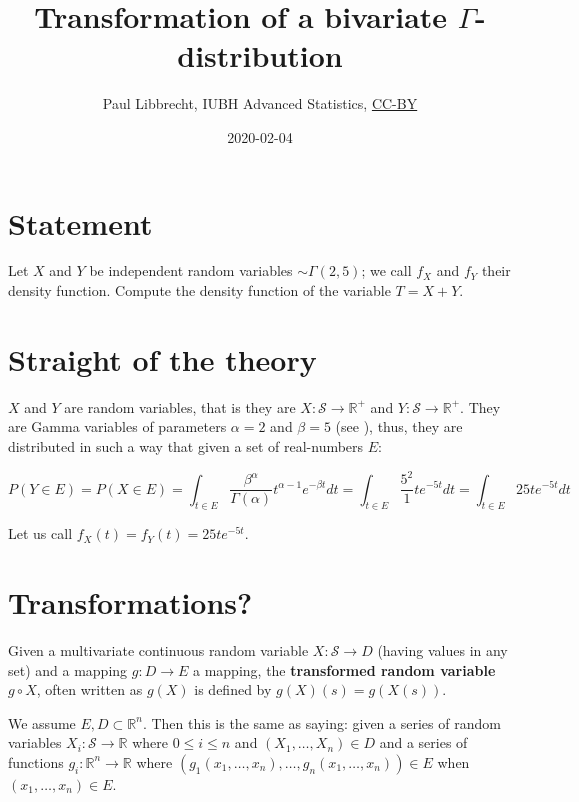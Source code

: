 \documentclass{article}
\newcommand\R{{\mathbb R} }
\renewcommand\S{{\mathcal S}}
\newcommand\goesto{{\longrightarrow}}
\begin{document}
\title{Transformation of a bivariate $\Gamma$-distribution}
\date{2020-02-04}

\author{Paul Libbrecht, IUBH Advanced Statistics, \href{https://creativecommons.org/licenses/by/4.0/}{CC-BY}}
\maketitle




\section{Statement}

Let $X$ and $Y$ be independent random variables $\sim\Gamma(2,5)$; we call $f_X$ and $f_Y$ their density function.
Compute the density function of the variable $T=X+Y$.

\section{Straight of the theory}

$X$ and $Y$ are random variables, that is they are $X:\S \longrightarrow \R^+$ and $Y:{\S }\longrightarrow \R^+$.
They are Gamma variables of parameters $\alpha=2$ and $\beta=5$ (see \cite{Wikipedia-Gamma}), thus, they are distributed in such a way that given a set of real-numbers $E$:

$$P(Y\in E) = P(X\in E) 
  = \int_{t\in E} \frac{\beta^\alpha}{\Gamma({\alpha})}t^{\alpha-1}e^{-\beta t}dt 
  = \int_{t\in E} \frac{5^2}{1} t e^{-5t}dt 
  = \int_{t\in E}25te^{-5t}dt$$
  
Let us call $f_X(t)=f_Y(t) = 25te^{-5t}$.

\section{Transformations?}



Given a multivariate continuous random variable $X: {\S } \rightarrow D$ (having values in any set) and a mapping $g: D \rightarrow E$ a mapping, the {\bf transformed random variable} $g \circ X$, often written as $g(X)$ is defined by $g(X)(s) = g(X(s))$.  

We assume $E,D\subset \R^n$. Then this is the same as saying: given a series of random variables $X_i: \S \goesto \R$ where $0\le i \le n$ and $(X_1, \dots, X_n) \in D$ and a series of functions $g_i: \R^n \goesto \R$ where $(g_1(x_1,\dots,x_n), \dots, g_n(x_1,\dots,x_n))\in E$ when $(x_1,\dots, x_n)\in E$.
\end{document}
